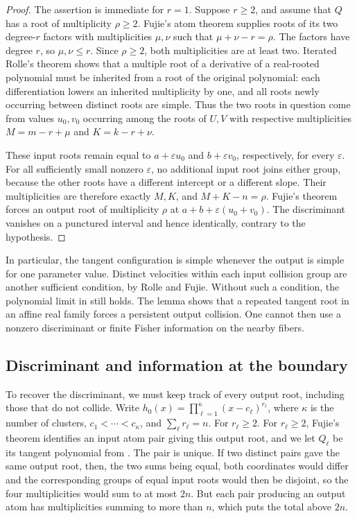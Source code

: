 \documentclass[12pt,reqno]{amsart}
\theoremstyle{definition}
\theoremstyle{remark}
\newcommand{\eps}{\varepsilon}
\begin{document}
\begin{proof}
The assertion is immediate for \(r=1\).  Suppose \(r\geq2\), and assume that \(Q\) has a root of multiplicity \(\rho\geq2\). Fujie's atom theorem supplies roots of its two degree-\(r\) factors
with multiplicities \(\mu,\nu\) such that \(\mu+\nu-r=\rho\). The factors have degree \(r\), so
\(\mu,\nu\leq r\). Since \(\rho\geq2\), both multiplicities are at least two. Iterated Rolle's theorem shows that a multiple root of a derivative of a real-rooted polynomial must be inherited from
a root of the original polynomial: each differentiation lowers an inherited multiplicity by one, and all roots newly occurring between distinct roots are simple.  Thus the two roots in question come from
values \(u_0,v_0\) occurring among the roots of \(U,V\) with respective multiplicities \(M=m-r+\mu\) and \(K=k-r+\nu\).

These input roots remain equal to \(a+\eps u_0\) and
\(b+\eps v_0\), respectively, for every \(\eps\).  For all
sufficiently small nonzero \(\eps\), no additional input root joins
either group, because the other roots have a different intercept or a
different slope.  Their multiplicities are therefore exactly \(M,K\),
and \(M+K-n=\rho\).  Fujie's theorem forces an output root of
multiplicity \(\rho\) at \(a+b+\eps(u_0+v_0)\).  The
discriminant vanishes on a punctured interval and hence identically,
contrary to the hypothesis.
\end{proof}

In particular, the tangent configuration is simple whenever the output is
simple for one parameter value.  Distinct velocities within each input
collision group are another sufficient condition, by Rolle and Fujie.
Without such a condition, the polynomial limit in
 still holds.  The lemma shows that a
repeated tangent root in an affine real family forces a persistent output
collision.  One cannot then use a nonzero discriminant or finite Fisher
information on the nearby fibers.

\subsection{Discriminant and information at the boundary}

To recover the discriminant, we must keep track of every output root,
including those that do not collide.  Write
\(h_0(x)=\prod_{\ell=1}^{\kappa}(x-c_\ell)^{r_\ell}\), where
\(\kappa\) is the number of clusters, \(c_1<\cdots<c_{\kappa}\), and
\(\sum_\ell r_\ell=n\).  For \(r_\ell\geq2\). For \(r_\ell\geq2\), Fujie's theorem identifies an input atom pair giving
this output root, and we let \(Q_\ell\) be its tangent polynomial from
. The pair is unique. If two distinct pairs gave the same output root, then, the two sums being equal, both coordinates would differ and the corresponding groups of equal input roots would then be disjoint, so the four multiplicities would sum to at most \(2n\). But each pair producing an output atom has multiplicities summing to more than \(n\), which puts the total above \(2n\).
\end{document}
